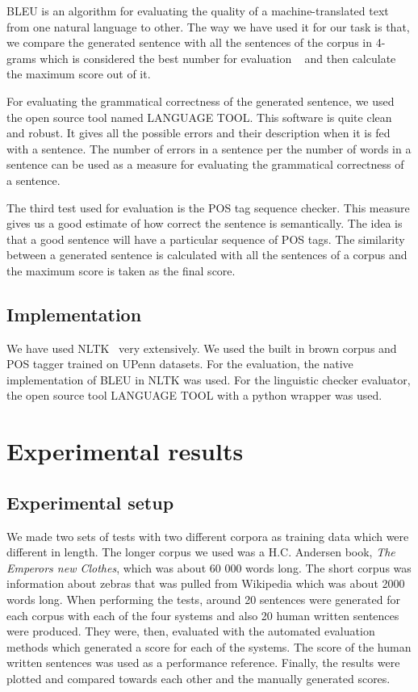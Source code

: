 \documentclass[a4paper,12pt]{article}
\begin{document}
BLEU is an algorithm for evaluating the quality of a 
machine-translated text from one natural language to other. The way we have used it 
for our task is that, we compare the generated sentence with all the sentences of the
corpus in 4-grams which is considered the best number for evaluation ~\cite{bleueval}
and then calculate the maximum score out of it.


For evaluating the grammatical correctness of the generated sentence, we used the
open source tool named LANGUAGE TOOL. This software is quite clean and robust. It gives 
all the possible errors and their description when it is fed with a sentence. The number 
of errors in a sentence per the number of words in a sentence can be used as a measure
for evaluating the grammatical correctness of a sentence.

The third test used for evaluation is the POS tag sequence checker. This measure 
gives us a good estimate of how correct the sentence is semantically. The idea
is that a good sentence will have a particular sequence of POS tags. The
similarity between a generated sentence is calculated with all the sentences of
a corpus and the maximum score is taken as the final score. 

\subsection{Implementation}
\label{sec:impl}

We have used NLTK~\cite{nltk} very extensively. We used the built in brown
corpus and POS tagger trained on UPenn datasets. 
For the evaluation, the native implementation of BLEU in NLTK was used. 
For the linguistic checker evaluator, the open source tool LANGUAGE TOOL with a python
wrapper was used.

\section{Experimental results}
\label{sec:exps}

\subsection{Experimental setup}

We made two sets of tests with two different corpora as training data which were
different in length. The longer corpus we used was a H.C. Andersen book,
\textit{The Emperors new Clothes}, which was about 60 000 words long. The short
corpus was information about zebras that was pulled from Wikipedia which was about 2000
words long. When performing the tests, around 20 sentences were generated for
each corpus with each of the four systems and also 20 human written sentences
were produced. They were, then,  evaluated with the automated evaluation methods
which generated a score for each of the systems. The score of the human written
sentences was used as a performance reference. Finally, the results were plotted
and compared towards each other and the manually generated scores.
\end{document}
